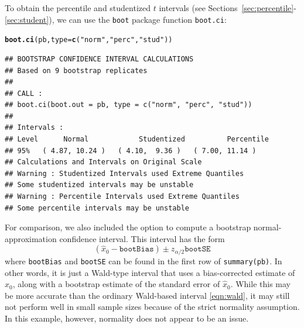 \documentclass{article}\usepackage[]{graphicx}\usepackage[]{color}
\makeatletter
\newcommand{\hlstr}[1]{\textcolor[rgb]{0.192,0.494,0.8}{#1}}%
\newcommand{\hlstd}[1]{\textcolor[rgb]{0.345,0.345,0.345}{#1}}%
\newcommand{\hlkwc}[1]{\textcolor[rgb]{0.333,0.667,0.333}{#1}}%
\newcommand{\hlkwd}[1]{\textcolor[rgb]{0.737,0.353,0.396}{\textbf{#1}}}%
\newenvironment{kframe}{%
 \def\at@end@of@kframe{}%
 \ifinner\ifhmode%
  \def\at@end@of@kframe{\end{minipage}}%
  \begin{minipage}{\columnwidth}%
 \fi\fi%
 \def\FrameCommand##1{\hskip\@totalleftmargin \hskip-\fboxsep
 \colorbox{shadecolor}{##1}\hskip-\fboxsep
     \hskip-\linewidth \hskip-\@totalleftmargin \hskip\columnwidth}%
 \MakeFramed {\advance\hsize-\width
   \@totalleftmargin\z@ \linewidth\hsize
   \@setminipage}}%
 {\par\unskip\endMakeFramed%
 \at@end@of@kframe}
\newenvironment{knitrout}{}{} %
\makeatother
\begin{document}
To obtain the percentile and studentized $t$ intervals (see Sections~\ref{sec:percentile}-\ref{sec:student}), we can use the \texttt{boot} package function \texttt{boot.ci}:
\begin{knitrout}
\color{fgcolor}\begin{kframe}
\begin{alltt}
\hlkwd{boot.ci}\hlstd{(pb,} \hlkwc{type} \hlstd{=} \hlkwd{c}\hlstd{(}\hlstr{"norm"}\hlstd{,} \hlstr{"perc"}\hlstd{,} \hlstr{"stud"}\hlstd{))}
\end{alltt}
\begin{verbatim}
## BOOTSTRAP CONFIDENCE INTERVAL CALCULATIONS
## Based on 9 bootstrap replicates
## 
## CALL : 
## boot.ci(boot.out = pb, type = c("norm", "perc", "stud"))
## 
## Intervals : 
## Level      Normal            Studentized          Percentile     
## 95%   ( 4.87, 10.24 )   ( 4.10,  9.36 )   ( 7.00, 11.14 )  
## Calculations and Intervals on Original Scale
## Warning : Studentized Intervals used Extreme Quantiles
## Some studentized intervals may be unstable
## Warning : Percentile Intervals used Extreme Quantiles
## Some percentile intervals may be unstable
\end{verbatim}
\end{kframe}
\end{knitrout}
For comparison, we also included the option to compute a bootstrap normal-approximation confidence interval.  This interval has the form
\[
  \left( \widehat{x}_0- \texttt{bootBias} \right) \pm z_{\alpha/2}\texttt{bootSE}
\]
where \texttt{bootBias} and \texttt{bootSE} can be found in the first row of \texttt{summary(pb)}.  In other words, it is just a Wald-type interval that uses a bias-corrected estimate of $x_0$, along with a bootstrap estimate of the standard error of $\widehat{x}_0$.  While this may be more accurate than the ordinary Wald-based interval \eqref{eqn:wald}, it may still not perform well in small sample sizes because of the strict normality assumption.  In this example, however, normality does not appear to be an issue.
\end{document}
